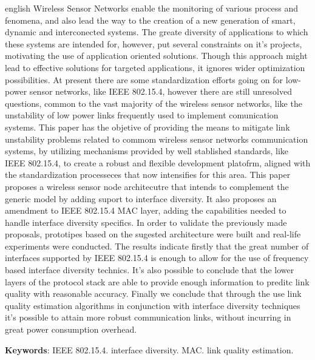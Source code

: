 \documentclass[
	12pt,				%
	openright,			%
	oneside,
	a4paper,			%
	english,			%
	french,				%
	spanish,			%
	brazil				%
	]{abntex2}
\begin{document}
\begin{resumo}[Abstract]
 \begin{otherlanguage*}{english}
   Wireless Sensor Networks enable the monitoring of various process and fenomena, and also lead the way to the creation of a new generation of smart, dynamic and interconected systems. The greate diversity of applications to which these systems are intended for, however, put several constraints on it's projects, motivating the use of application oriented solutions. Though this approach might lead to effective solutions for targeted applications, it ignores wider optimization possibilities. At present there are some standardization efforts going on for low-power sensor networks, like IEEE 802.15.4, however there are still unresolved questions, common to the vast majority of the wireless sensor networks, like the unstability of low power links frequently used to implement comunication systems. This paper has the objetive of providing the means to mitigate link unstability problems related to commom wireless sensor networks communication systems, by utilizing mechanisms provided by well stablished standards, like IEEE 802.15.4, to create a robust and flexible development platofrm, aligned with the standardization processeces that now intensifies for this area. This paper proposes a wireless sensor node architecutre that intends to complement the generic model by adding suport to interface diversity. It also proposes an amendment to IEEE 802.15.4 MAC layer, adding the capabilities needed to handle interface diversity specifics. In order to validate the previously made proposals, prototipes based on the sugested architecture were built and real-life experiments were conducted. The results indicate firstly that the great number of interfaces supported by IEEE 802.15.4 is enough to allow for the use of frequency based interface diversity technics. It's also possible to conclude that the lower layers of the protocol stack are able to provide enough information to preditc link quality with reasonable accuracy. Finally we conclude that through the use link quality estimation algorithms  in conjunction with interface diversity techniques it's possible to attain more robust communication links, without incurring in great power consumption overhead.

   \vspace{\onelineskip}
 
   \noindent 
   \textbf{Keywords}: IEEE 802.15.4. interface diversity. MAC. link quality estimation.
 \end{otherlanguage*}
\end{resumo}
\end{document}

